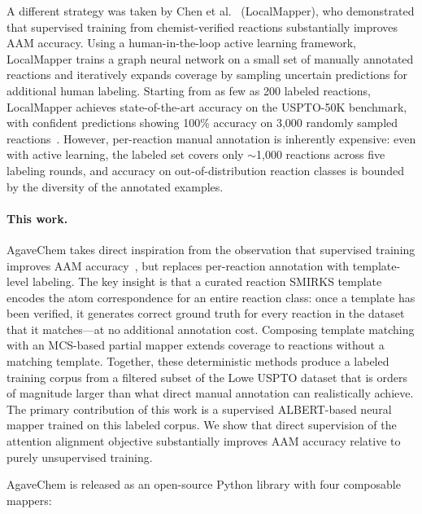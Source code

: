 \documentclass[12pt]{article}
\begin{document}
A different strategy was taken by Chen et al.~\cite{Chen2024}
(LocalMapper), who demonstrated that supervised training from
chemist-verified reactions substantially improves AAM accuracy.  Using
a human-in-the-loop active learning framework, LocalMapper trains a
graph neural network on a small set of manually annotated reactions and
iteratively expands coverage by sampling uncertain predictions for
additional human labeling.  Starting from as few as 200 labeled
reactions, LocalMapper achieves state-of-the-art accuracy on the
USPTO-50K benchmark, with confident predictions showing 100\% accuracy
on 3{,}000 randomly sampled reactions~\cite{Chen2024}.  However,
per-reaction manual annotation is inherently expensive: even with
active learning, the labeled set covers only $\sim$1{,}000 reactions
across five labeling rounds, and accuracy on out-of-distribution
reaction classes is bounded by the diversity of the annotated
examples.

\paragraph{This work.}
AgaveChem takes direct inspiration from the observation that supervised
training improves AAM accuracy~\cite{Chen2024}, but replaces
per-reaction annotation with template-level labeling.  The key
insight is that a curated reaction SMIRKS template encodes the atom
correspondence for an entire reaction class: once a template has been
verified, it generates correct ground truth for every reaction in the
dataset that it matches---at no additional annotation cost.  Composing
template matching with an MCS-based partial mapper extends coverage to
reactions without a matching template.  Together, these deterministic
methods produce a labeled training corpus from a filtered subset of the
Lowe USPTO dataset that is orders of magnitude larger than what direct
manual annotation can realistically achieve.  The primary contribution
of this work is a supervised ALBERT-based neural mapper trained on
this labeled corpus.  We show that direct supervision of the attention
alignment objective substantially improves AAM accuracy relative to
purely unsupervised training.

AgaveChem is released as an open-source Python library with four
composable mappers:
\end{document}
